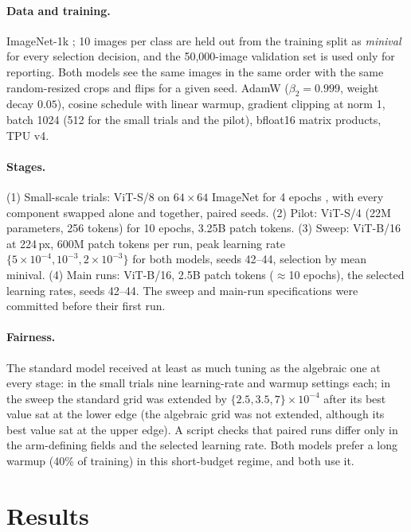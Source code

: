 \documentclass[10pt]{article}
\begin{document}
\paragraph{Data and training.} ImageNet-1k \cite{russakovsky2015imagenet};
10 images per class are held out from the training split as \emph{minival}
for every selection decision, and the 50{,}000-image validation set is used
only for reporting. Both models see the same images in the same order with
the same random-resized crops and flips for a given seed. AdamW
($\beta_2=0.999$, weight decay $0.05$), cosine schedule with linear warmup,
gradient clipping at norm 1, batch 1024 (512 for the small trials and the
pilot), bfloat16 matrix products, TPU v4.

\paragraph{Stages.} (1) Small-scale trials: ViT-S/8 on $64\times64$
ImageNet for 4 epochs \cite{chrabaszcz2017downsampled}, with every component
swapped alone and together, paired seeds. (2) Pilot: ViT-S/4 (22M
parameters, 256 tokens) for 10 epochs, 3.25B patch tokens. (3) Sweep:
ViT-B/16 at 224\,px, 600M patch tokens per run, peak learning rate
$\{5\!\times\!10^{-4},10^{-3},2\!\times\!10^{-3}\}$ for both models, seeds
42--44, selection by mean minival. (4) Main runs: ViT-B/16, 2.5B patch tokens
($\approx$10 epochs), the selected learning rates, seeds 42--44. The
sweep and main-run specifications were committed before their first run.

\paragraph{Fairness.} The standard model received at least as much tuning
as the algebraic one at every stage: in the small trials nine
learning-rate and warmup settings each; in the sweep the standard grid was
extended by $\{2.5,3.5,7\}\times10^{-4}$ after its best value sat at the
lower edge (the algebraic grid was not extended, although its best value sat
at the upper edge). A script checks that paired runs differ only in the
arm-defining fields and the selected learning rate. Both models prefer a
long warmup (40\% of training) in this short-budget regime, and both use it.

\section{Results}
\label{sec:results}
\end{document}
